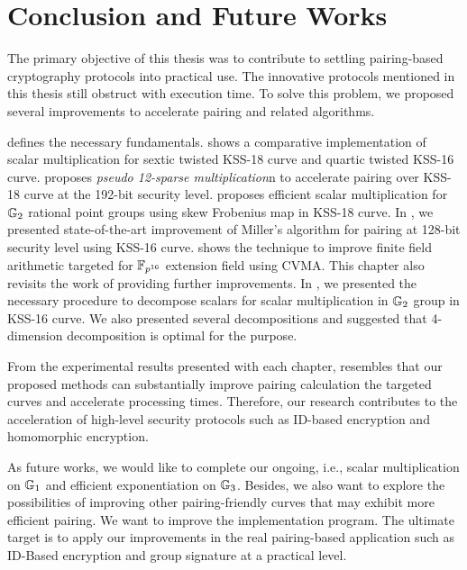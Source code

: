 \chapter{Conclusion and Future Works}
\label{ch:general_conclusin}
The primary objective of this thesis was to contribute to settling pairing-based cryptography protocols into practical use.
The innovative protocols mentioned in this thesis still obstruct with execution time.
To solve this problem, we proposed several improvements to accelerate pairing and related algorithms.

  defines the necessary fundamentals.
 shows a comparative implementation of scalar multiplication for sextic twisted KSS-18 curve and quartic twisted KSS-16 curve.
 proposes \textit{pseudo 12-sparse multiplication}n to accelerate pairing over KSS-18 curve at the 192-bit security level.
 proposes efficient scalar multiplication for ${\mathbb{G}}_{2}$ rational point groups using skew Frobenius map in KSS-18 curve.
In , we presented state-of-the-art improvement of Miller's algorithm for pairing at 128-bit security level using KSS-16 curve.
 shows the technique to improve finite field arithmetic targeted for $\mathbb{F}_{p^{16}}$ extension field using CVMA. This chapter also revisits the work of  providing further improvements.
In , we presented the necessary procedure to decompose scalars for scalar multiplication in ${\mathbb{G}}_{2}$ group in KSS-16 curve.
We also presented several decompositions and suggested that 4-dimension decomposition is optimal for the purpose.

From the experimental results presented with each chapter, resembles that our proposed methods can substantially improve pairing calculation the targeted curves and accelerate processing times.  
Therefore, our research contributes to the acceleration of high-level security protocols such as ID-based encryption and homomorphic encryption.

As future works, we would like to complete our ongoing, i.e., scalar multiplication on ${\mathbb{G}}_{1}$ and efficient exponentiation on ${\mathbb{G}}_{3}$.
Besides, we also want to explore the possibilities of improving other pairing-friendly curves that may exhibit more efficient pairing.
We want to improve the implementation program.
The ultimate target is to apply our improvements in the real pairing-based application such as ID-Based encryption and group signature at a practical level.